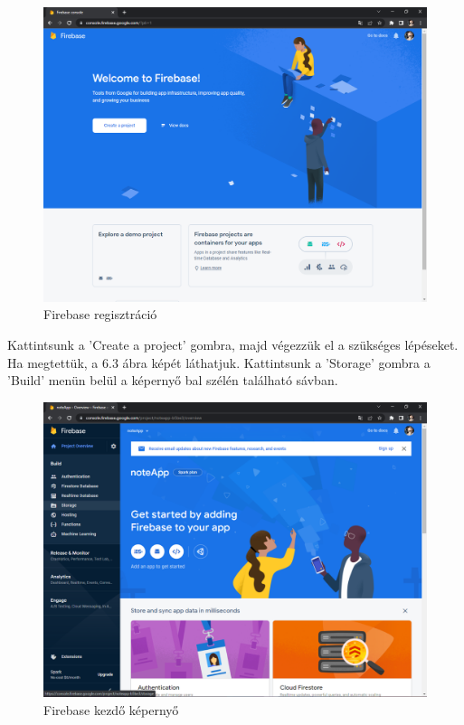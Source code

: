 \begin{figure}[h]
	\centering
	\includegraphics[scale=0.2]{images/config_2.png}
	\caption{Firebase regisztráció}
	\label{fig:firebase_reg}
\end{figure}
\noindent Kattintsunk a 'Create a project' gombra, majd végezzük el a szükséges lépéseket.
\\Ha megtettük, a 6.3 ábra képét láthatjuk. Kattintsunk a 'Storage' gombra a 'Build' menün belül a képernyő bal szélén található sávban.

\begin{figure}[h]
	\centering
	\includegraphics[scale=0.2]{images/config_3.png}
	\caption{Firebase kezdő képernyő}
	\label{fig:firebase_storage_reg}
\end{figure}

